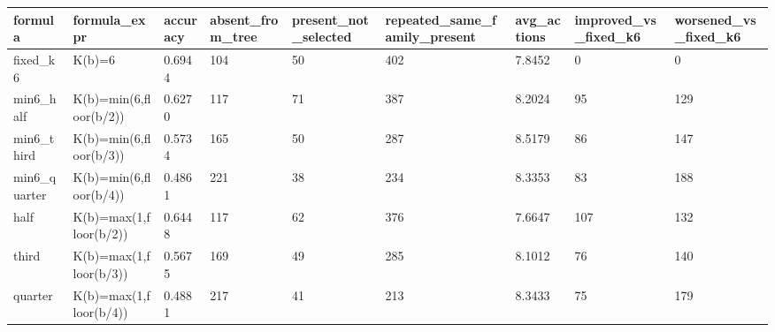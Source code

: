 \begin{tabular}{lllllllll}
\hline
formula & formula\_expr & accuracy & absent\_from\_tree & present\_not\_selected & repeated\_same\_family\_present & avg\_actions & improved\_vs\_fixed\_k6 & worsened\_vs\_fixed\_k6 \\
\hline
fixed\_k6 & K(b)=6 & 0.6944 & 104 & 50 & 402 & 7.8452 & 0 & 0 \\
min6\_half & K(b)=min(6,floor(b/2)) & 0.6270 & 117 & 71 & 387 & 8.2024 & 95 & 129 \\
min6\_third & K(b)=min(6,floor(b/3)) & 0.5734 & 165 & 50 & 287 & 8.5179 & 86 & 147 \\
min6\_quarter & K(b)=min(6,floor(b/4)) & 0.4861 & 221 & 38 & 234 & 8.3353 & 83 & 188 \\
half & K(b)=max(1,floor(b/2)) & 0.6448 & 117 & 62 & 376 & 7.6647 & 107 & 132 \\
third & K(b)=max(1,floor(b/3)) & 0.5675 & 169 & 49 & 285 & 8.1012 & 76 & 140 \\
quarter & K(b)=max(1,floor(b/4)) & 0.4881 & 217 & 41 & 213 & 8.3433 & 75 & 179 \\
\hline
\end{tabular}
